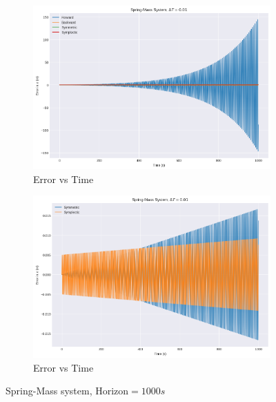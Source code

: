 \documentclass[11pt]{article}
\begin{document}
    \begin{figure}[H]
        \centering
        \begin{subfigure}[H]{0.49\linewidth}
            \includegraphics[width=\linewidth]{../sm16.png}
            \caption*{Error vs Time}
        \end{subfigure}
        \begin{subfigure}[H]{0.49\linewidth}
            \includegraphics[width=\linewidth]{../sm17.png}
            \caption*{Error vs Time}
        \end{subfigure}
        \caption*{Spring-Mass system, Horizon$ = 1000s$}
        \end{figure}
\end{document}
